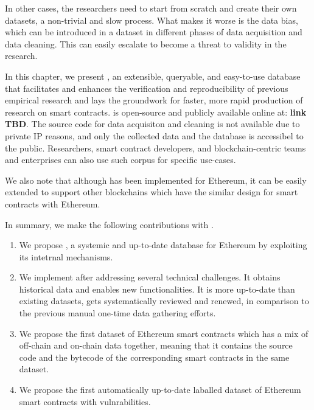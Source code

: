 	In other cases, the researchers need to start from scratch and create their own datasets, a non-trivial and slow process.
	What makes it worse is the data bias, which can be introduced in a dataset in different phases of data acquisition and data cleaning.
	This can easily escalate to become a threat to validity in the research.~\cite{Empirical-Evaluation-of-Smart-Contract-Testing:What-is-the-Best-Choice}

	In this chapter, we present \etherbase, an extensible, queryable, and easy-to-use database that facilitates and enhances the verification and reproducibility of previous empirical research and lays the groundwork for faster, more rapid production of research on smart contracts.
	\etherbase is open-source and publicly available online at: \textbf{link TBD}.
	The source code for data acquisiton and cleaning is not available due to private IP reasons, and only the collected data and the database is accessibel to the public.
	Researchers, smart contract developers, and blockchain-centric teams and enterprises can also use such corpus for specific use-cases.

	We also note that although \etherbase has been implemented for Ethereum, it can be easily extended to support other blockchains which have the similar design for smart contracts with Ethereum.

	In summary, we make the following contributions with \etherbase.
	\begin{enumerate}
		\item We propose \etherbase, a systemic and up-to-date database for Ethereum by exploiting its intetrnal mechanisms.
		\item We implement \etherbase after addressing several technical challenges. It obtains historical data and enables new functionalities. It is more up-to-date than existing datasets, gets systematically reviewed and renewed, in comparison to the previous manual one-time data gathering efforts.
		\item We propose the first dataset of Ethereum smart contracts which has a mix of off-chain and on-chain data together, meaning that it contains the source code and the bytecode of the corresponding smart contracts in the same dataset.
		\item We propose the first automatically up-to-date laballed dataset of Ethereum smart contracts with vulnrabilities.
	\end{enumerate}

